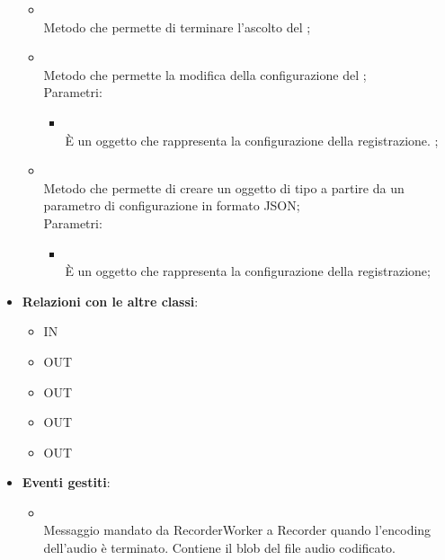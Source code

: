 \begin{itemize}
\begin{itemize}
		\item[]  \\
		Metodo che permette di terminare l'ascolto del ;\\
		\item[]  \\
		Metodo che permette la modifica della configurazione del ;\\
		Parametri:
		\begin{itemize}
			\item {} \\
			È un oggetto che rappresenta la configurazione della registrazione. ;
		\end{itemize}
		\item[]  \\
		Metodo che permette di creare un oggetto di tipo  a partire da un parametro di configurazione in formato JSON;\\
		Parametri:
		\begin{itemize}
			\item {} \\
			È un oggetto che rappresenta la configurazione della registrazione;
		\end{itemize}
	\end{itemize}
	\item \textbf{Relazioni con le altre classi}:
	\begin{itemize}
		\item IN \hyperlink{BoolObserver_label}{}
		\item OUT \hyperlink{RecorderMsg_label}{}
		\item OUT \hyperlink{RecorderWorker_label}{}
		\item OUT \hyperlink{RecorderWorkerMsg_label}{}
		\item OUT \hyperlink{SpeechEndSubject_label}{}
	\end{itemize}
	\item \textbf{Eventi gestiti}:
	\begin{itemize}
\item {} \\ Messaggio mandato da RecorderWorker a Recorder quando l'encoding dell'audio è terminato. Contiene il blob del file audio codificato.	\end{itemize}
\end{itemize}

